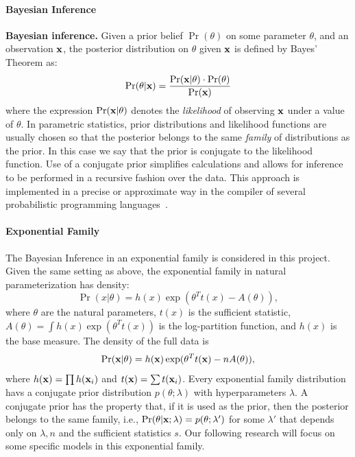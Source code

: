 \documentclass{article}
\begin{document}
\paragraph{Bayesian Inference}
\noindent \textbf{Bayesian inference.} 
Given a prior belief $\Pr(\theta)$ on some parameter $\theta$,
and an observation $\textbf{x}$, the posterior distribution on $\theta$
given $\textbf{x}$ is defined by Bayes' Theorem as:
\[
  \Pr(\theta | \textbf{x}) = \frac{\Pr(\textbf{x} | \theta) \cdot \Pr(\theta)}{\Pr(\textbf{x})}
\]
where the expression $\Pr(\textbf{x} | \theta)$ denotes the
\emph{likelihood} of observing $\textbf{x}$ under a value of
$\theta$. 
In parametric statistics, prior distributions and likelihood functions are usually chosen so that the posterior
belongs to the same \emph{family} of distributions as the prior. In this case we say that the prior
is conjugate to the likelihood function. Use of a conjugate prior
simplifies calculations and allows for inference to be performed in a
recursive fashion over the data. This approach is implemented in a
precise or approximate way in the compiler of several
probabilistic programming languages~\cite{BartheFGAGHS16}.
%
%
\paragraph{Exponential Family}
The Bayesian Inference in an exponential family is considered in this project. Given the same setting as above, the exponential family in natural parameterization has density:
%
\[
	\Pr(x | \theta) = h(x) \exp(\theta^{T} t(x) - A(\theta)),
\]
%
where $\theta$ are the natural parameters, $t(x)$ is the sufficient statistic,
$A(\theta) = \int h(x) \exp(\theta^T t(x))$
is the log-partition function, and $h(x)$ is the base measure.
The density of the full data is
\[
	\Pr(\textbf{x} | \theta) = 
	h(\textbf{x}) \exp(\theta^{T} t(\textbf{x}) - nA(\theta)),
\]
%
where $h(\textbf{x}) = \prod h(\textbf{x}_i)$ and 
$t(\textbf{x}) = \sum t(\textbf{x}_i)$.
%
Every exponential family distribution havs a conjugate prior distribution $p(\theta; \lambda)$
with hyperparameters $\lambda$. 
A conjugate prior has the property that, if it is used as the prior, 
then the posterior belongs to the same family, i.e., $\Pr(\theta | \textbf{x}; \lambda) = p(\theta;\lambda')$ 
for some $\lambda'$ that depends only on $\lambda, n$ and the sufficient statistics $s$.
%
Our following research will focus on some specific models in this exponential family. 
\end{document}
